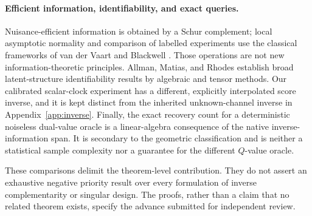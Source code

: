 \paragraph{Efficient information, identifiability, and exact queries.}
Nuisance-efficient information is obtained by a Schur complement; local asymptotic normality and comparison of labelled experiments use the classical frameworks of van der Vaart and Blackwell \cite{vdV,Blackwell}. Those operations are not new information-theoretic principles. Allman, Matias, and Rhodes \cite{AMR} establish broad latent-structure identifiability results by algebraic and tensor methods. Our calibrated scalar-clock experiment has a different, explicitly interpolated score inverse, and it is kept distinct from the inherited unknown-channel inverse in Appendix~\ref{app:inverse}. Finally, the exact recovery count for a deterministic noiseless dual-value oracle is a linear-algebra consequence of the native inverse-information span. It is secondary to the geometric classification and is neither a statistical sample complexity nor a guarantee for the different $Q$-value oracle.

These comparisons delimit the theorem-level contribution. They do not assert an exhaustive negative priority result over every formulation of inverse complementarity or singular design. The proofs, rather than a claim that no related theorem exists, specify the advance submitted for independent review.
